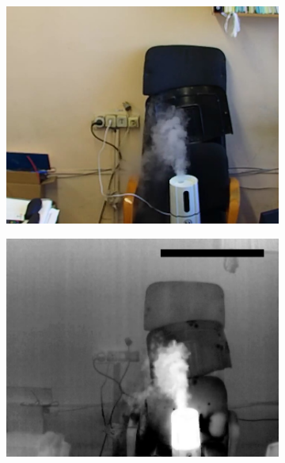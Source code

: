 \documentclass[14pt, a4paper]{extreport}
\begin{document}
\begin{figure}[h!]
\begin{subfigure}{.32\textwidth}
			\includegraphics[width = \textwidth]{image/chapter_3/examples/img/214}
		\end{subfigure}
		\begin{subfigure}{.32\textwidth}
			\centering
			\includegraphics[width = \textwidth]{image/chapter_3/examples/tep/214}
		\end{subfigure}
		\begin{subfigure}{.32\textwidth}
			\centering

\end{subfigure}
\end{figure}
\end{document}
